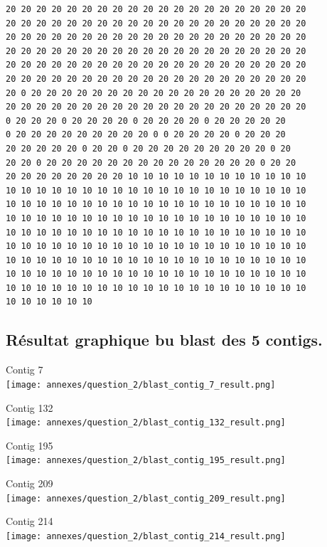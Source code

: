 \documentclass[10.9pt]{article} %
\begin{document}
\begin{verbatim}
20 20 20 20 20 20 20 20 20 20 20 20 20 20 20 20 20 20 20 20 
20 20 20 20 20 20 20 20 20 20 20 20 20 20 20 20 20 20 20 20 
20 20 20 20 20 20 20 20 20 20 20 20 20 20 20 20 20 20 20 20 
20 20 20 20 20 20 20 20 20 20 20 20 20 20 20 20 20 20 20 20 
20 20 20 20 20 20 20 20 20 20 20 20 20 20 20 20 20 20 20 20 
20 20 20 20 20 20 20 20 20 20 20 20 20 20 20 20 20 20 20 20 
20 0 20 20 20 20 20 20 20 20 20 20 20 20 20 20 20 20 20 20 
20 20 20 20 20 20 20 20 20 20 20 20 20 20 20 20 20 20 20 20 
0 20 20 20 0 20 20 20 20 0 20 20 20 20 0 20 20 20 20 20 
0 20 20 20 20 20 20 20 20 20 0 0 20 20 20 20 0 20 20 20 
20 20 20 20 20 0 20 20 0 20 20 20 20 20 20 20 20 20 0 20 
20 20 0 20 20 20 20 20 20 20 20 20 20 20 20 20 20 0 20 20 
20 20 20 20 20 20 20 20 10 10 10 10 10 10 10 10 10 10 10 10 
10 10 10 10 10 10 10 10 10 10 10 10 10 10 10 10 10 10 10 10 
10 10 10 10 10 10 10 10 10 10 10 10 10 10 10 10 10 10 10 10 
10 10 10 10 10 10 10 10 10 10 10 10 10 10 10 10 10 10 10 10 
10 10 10 10 10 10 10 10 10 10 10 10 10 10 10 10 10 10 10 10 
10 10 10 10 10 10 10 10 10 10 10 10 10 10 10 10 10 10 10 10 
10 10 10 10 10 10 10 10 10 10 10 10 10 10 10 10 10 10 10 10 
10 10 10 10 10 10 10 10 10 10 10 10 10 10 10 10 10 10 10 10 
10 10 10 10 10 10 10 10 10 10 10 10 10 10 10 10 10 10 10 10 
10 10 10 10 10 10 
\end{verbatim}

\subsection{Résultat graphique bu blast des 5 contigs.}\label{13}

Contig 7\\
\texttt{[image: annexes/question\_2/blast\_contig\_7\_result.png]}

Contig 132\\
\texttt{[image: annexes/question\_2/blast\_contig\_132\_result.png]}

Contig 195\\
\texttt{[image: annexes/question\_2/blast\_contig\_195\_result.png]}

Contig 209\\
\texttt{[image: annexes/question\_2/blast\_contig\_209\_result.png]}

Contig 214\\
\texttt{[image: annexes/question\_2/blast\_contig\_214\_result.png]}
\end{document}
